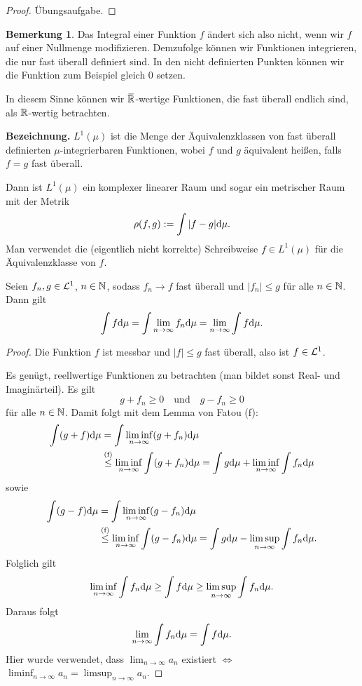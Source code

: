 \documentclass[
 a4paper,
 12pt,
 parskip=half
 ]{scrreprt}
\theoremstyle{plain}
\theoremstyle{definition}
\newtheorem{rmrk}[thm]{Bemerkung}
\numberwithin{equation}{section}
\begin{document}
\begin{proof}
 Übungsaufgabe.
\end{proof}

\begin{rmrk}
 Das Integral einer Funktion $f$ ändert sich also nicht, wenn wir $f$ auf einer Nullmenge modifizieren. Demzufolge können wir Funktionen integrieren, die nur fast überall definiert sind. In den nicht definierten Punkten können wir die Funktion zum Beispiel gleich 0 setzen.
 
 In diesem Sinne können wir $\realext$-wertige Funktionen, die fast überall endlich sind, als $\mathbb{R}$-wertig betrachten.
\end{rmrk}

\textbf{Bezeichnung.} 
$L^1(\mu)$ ist die Menge der Äquivalenzklassen von fast überall definierten $\mu$-integrierbaren Funktionen, wobei $f$ und $g$ äquivalent heißen, falls $f = g$ fast überall.

Dann ist $L^1(\mu)$ ein komplexer linearer Raum und sogar ein metrischer Raum mit der Metrik
\[ \rho( f,g ) := \int | f -g | \mathrm{d} \mu. \]
Man verwendet die (eigentlich nicht korrekte) Schreibweise $f \in L^1(\mu)$ für die Äqui\-valenz\-klasse von $f$.

\begin{thm}
 Seien $f_n, g \in \mathcal{L}^1$, $n \in \mathbb{N}$, sodass $f_n \to f$ fast überall und $|f_n| \le g$ für alle $n \in \mathbb{N}$. Dann gilt
 \[ \int f \mathrm{d} \mu = \int \lim_{n \to \infty} f_n \mathrm{d} \mu = \lim_{n \to \infty} \int f \mathrm{d} \mu. \]
\end{thm}

\begin{proof}
 Die Funktion $f$ ist messbar und $|f| \le g$ fast überall, also ist $f \in \mathcal{L}^1$. 
 
 Es genügt, reellwertige Funktionen zu betrachten (man bildet sonst Real- und Imaginärteil). Es gilt
 \[ g + f_n \ge 0 \quad \text{und} \quad g - f_n \ge 0 \]
 für alle $n \in \mathbb{N}$. Damit folgt mit dem Lemma von Fatou (f):
 \[ \begin{aligned}
  \int(g+f) \mathrm{d} \mu &= \int \liminf_{n \to \infty} (g + f_n) \mathrm{d} \mu \\
  &\overset{(\text{f})}{\le} \liminf_{n \to \infty} \int (g+f_n) \mathrm{d} \mu = \int g \mathrm{d} \mu + \liminf_{n \to \infty} \int f_n \mathrm{d} \mu 
    \end{aligned} \]
  sowie
 \[ \begin{aligned}
 \int(g-f) \mathrm{d} \mu &= \int \liminf_{n \to \infty} (g - f_n) \mathrm{d} \mu \\
  &\overset{(\text{f})}{\le} \liminf_{n \to \infty} \int(g - f_n) \mathrm{d} \mu = \int g \mathrm{d} \mu - \limsup_{n \to \infty} \int f_n \mathrm{d} \mu.
    \end{aligned} \]
 Folglich gilt
 \[ \liminf_{n \to \infty} \int f_n \mathrm{d} \mu \ge \int f \mathrm{d} \mu \ge \limsup_{n \to \infty} \int f_n \mathrm{d} \mu. \]
 Daraus folgt
 \[ \lim_{n \to \infty} \int f_n \mathrm{d} \mu = \int f \mathrm{d} \mu. \]
 Hier wurde verwendet, dass $\lim_{n \to \infty} a_n$ existiert $\Leftrightarrow$ $\liminf_{n \to \infty} a_n = \limsup_{n \to \infty} a_n$.
\end{proof}
\end{document}
